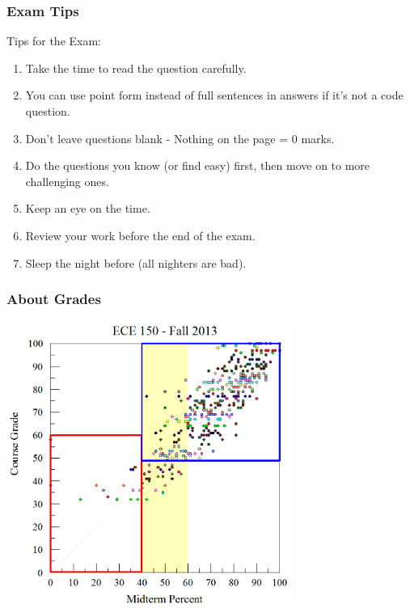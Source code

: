 \begin{frame}
\frametitle{Exam Tips}

Tips for the Exam:

\begin{enumerate}
	\item Take the time to read the question carefully.
	\item You can use point form instead of full sentences in answers if it's not a code question.
	\item Don't leave questions blank - Nothing on the page = 0 marks.
	\item Do the questions you know (or find easy) first, then move on to more challenging ones.
	\item Keep an eye on the time.
	\item Review your work before the end of the exam.
	\item Sleep the night before (all nighters are bad).
	
\end{enumerate}

\end{frame}


\begin{frame}
\frametitle{About Grades}

\begin{center}
\includegraphics[width=0.7\textwidth]{images/2013-midterm-plot.png}
\end{center}

\end{frame}

